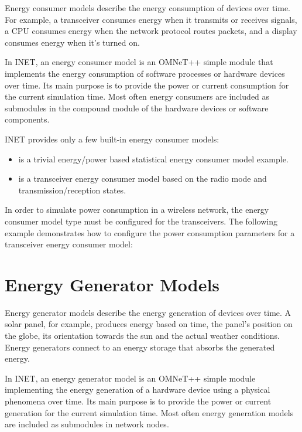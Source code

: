 Energy consumer models describe the energy consumption of devices over time.
For example, a transceiver consumes energy when it transmits or
receives signals, a CPU consumes energy when the network protocol routes
packets, and a display consumes energy when it's turned on.

In INET, an energy consumer model is an OMNeT++ simple module that implements
the energy consumption of software processes or hardware devices over time.
Its main purpose is to provide the power or current consumption for the
current simulation time. Most often energy consumers are included as
submodules in the compound module of the hardware devices or software
components.

INET provides only a few built-in energy consumer models:

\begin{itemize}
        \item {} is a trivial energy/power based statistical energy consumer model example.
        \item {} is a transceiver energy consumer model based on the radio mode and transmission/reception states.
\end{itemize}

In order to simulate power consumption in a wireless network, the energy
consumer model type must be configured for the transceivers. The following
example demonstrates how to configure the power consumption parameters for
a transceiver energy consumer model:



\section{Energy Generator Models}
\label{sec:power:energy-generator-models}

Energy generator models describe the energy generation of devices over time.
A solar panel, for example, produces energy based on time, the panel's
position on the globe, its orientation towards the sun and the actual weather
conditions. Energy generators connect to an energy storage that absorbs the
generated energy.

In INET, an energy generator model is an OMNeT++ simple module implementing
the energy generation of a hardware device using a physical phenomena over
time. Its main purpose is to provide the power or current generation for
the current simulation time. Most often energy generation models are
included as submodules in network nodes.

